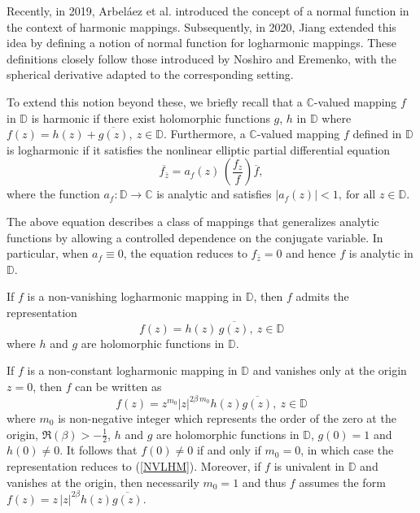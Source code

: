 \documentclass[11pt, reqno]{amsart}
\theoremstyle{definition}
\theoremstyle{remark}
\numberwithin{equation}{section}
\begin{document}
Recently, in 2019, Arbeláez et al. \cite{arbelaez-nhm-2019} introduced the concept of a normal function in the context of harmonic mappings. Subsequently, in 
2020, Jiang \cite{jiang-nolm-2020} extended this idea by defining a notion of normal function for logharmonic 
mappings. These definitions closely follow those introduced by Noshiro and Eremenko, with the spherical derivative adapted to the corresponding setting. \smallskip

To extend this notion beyond these, we briefly recall that a $\mathbb C$-valued mapping $f$ in $\mathbb D$ 
is harmonic if there exist holomorphic functions $g$, $h$ in $\mathbb D$ where $f(z)=h(z)+\overline{g(z)},\ z\in\mathbb D$. Furthermore, a $\mathbb C$-valued 
mapping $f$ defined in $\mathbb D$ is logharmonic if it satisfies the nonlinear elliptic partial differential equation
\begin{equation*}
\overline{f_{\bar z}} = a_f(z)\,\left(\frac{f_z}{f}\right){\overline{f}}, \tag{i} \label{NLEPDE}
\end{equation*}
where the function $a_f : \mathbb D \to \mathbb{C}$ is analytic and satisfies $|a_f(z)| < 1,\  \text{for all } z \in \mathbb D.$%
\smallskip
    
The above equation describes a class of mappings that generalizes analytic functions by allowing a 
controlled dependence on the conjugate variable. In particular, when $a_f \equiv 0$, 
the equation reduces to $f_{\bar z} = 0$ and hence $f$ is analytic in $\mathbb D$.
\smallskip

If $f$ is a non-vanishing logharmonic mapping in $\mathbb D$, then $f$ admits the representation
\begin{equation*}
f(z) = h(z)\,\overline{g(z)},\ z\in\mathbb D\tag{ii} \label{NVLHM}
\end{equation*}
where $h$ and $g$ are holomorphic functions in $\mathbb D$. \smallskip

If $f$ is a non-constant logharmonic mapping in $\mathbb D$ and vanishes only at the origin $z=0$, then $f$ can be written as
\begin{equation*}
f(z) = z^{m_0} |z|^{2\beta\,m_0} h(z)\overline{g(z)},\ z\in\mathbb D \tag{iii} \label{VLHM}
\end{equation*}
where $m_0$ is non-negative integer which represents the order of the zero at the origin, $\Re(\beta) > -\tfrac{1}{2}$,
$h$ and $g$ are holomorphic functions in $\mathbb D$, $g(0) = 1$ and $h(0) \neq 0$. 
It follows that $f(0) \neq 0$ if and only if $m_0 = 0$, in which case the representation reduces to 
(\ref{NVLHM}). Moreover, if $f$ is univalent in $\mathbb D$ and vanishes at the origin, then 
necessarily $m_0 = 1$ and thus $f$ assumes the form
$
f(z) = z\,|z|^{2\beta} h(z)\overline{g(z)}.
$\smallskip
\end{document}
